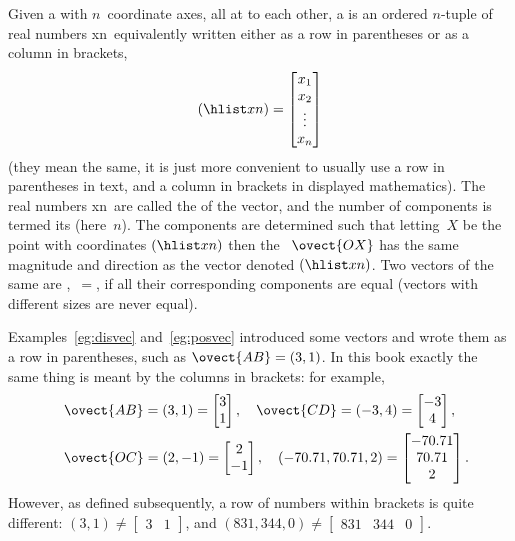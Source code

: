 \begin{definition} \label{def:vecs}
Given a  with \(n\)~coordinate axes, all at  to each other, a  is an ordered \(n\)-tuple of real numbers \hlist xn\ equivalently written either as a row in parentheses or as a column in brackets,
\begin{equation*}
(\hlist xn)=\begin{bmatrix} x_1\\x_2\\\vdots\\x_n \end{bmatrix}
\end{equation*}
(they mean the same, it is just more convenient to usually use a row in parentheses in text, and a column in brackets in displayed mathematics).
The real numbers \hlist xn\ are called the  of the vector, and the number of components is termed its  (here~\(n\)).
The components are determined such that letting~\(X\) be the point with coordinates \((\hlist xn)\) then the ~\(\ovect{OX}\) has the same magnitude and direction as the vector denoted \((\hlist xn)\).
Two vectors of the same  are ,~\(=\), if all their corresponding components are equal (vectors with different sizes are never equal).
\end{definition}

Examples~\ref{eg:disvec} and~\ref{eg:posvec} introduced some vectors and wrote them as a row in parentheses, such as \(\ovect{AB}=(3,1)\).
In this book exactly the same thing is meant by the columns in brackets: for example,
\begin{eqnarray*}&&
\ovect{AB}=(3,1)=\begin{bmatrix} 3\\1 \end{bmatrix},\quad
\ovect{CD}=(-3,4)=\begin{bmatrix} -3\\4 \end{bmatrix},\quad
\\&&
\ovect{OC}=(2,-1)=\begin{bmatrix} 2\\-1 \end{bmatrix},\quad
(-70.71,70.71,2)=\begin{bmatrix} -70.71\\70.71\\2 \end{bmatrix}.
\end{eqnarray*}
However, as defined subsequently, a row of numbers within brackets is  quite different: \((3,1)\neq\begin{bmatrix} 3&1 \end{bmatrix}\),  and \((831,344,0)\neq\begin{bmatrix} 831&344&0 \end{bmatrix}\).

